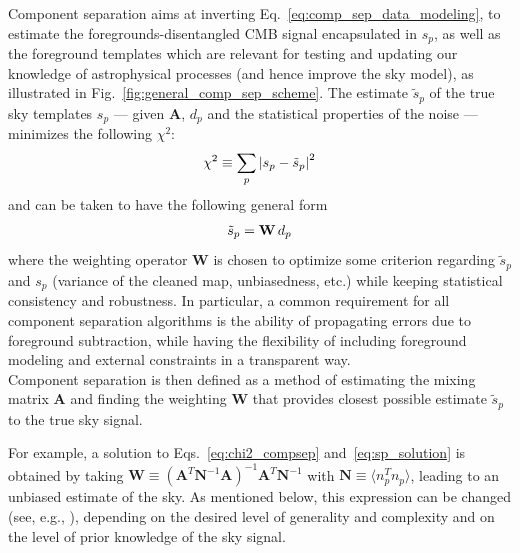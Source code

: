 Component separation aims at inverting Eq.~\ref{eq:comp_sep_data_modeling}, to estimate the foregrounds-disentangled CMB signal encapsulated in $s_p$, as well as the foreground templates which are relevant for testing and updating our knowledge of astrophysical processes (and hence improve the sky model), as illustrated in Fig.~\ref{fig:general_comp_sep_scheme}.
The estimate $\tilde{s}_p$ of the true sky templates $s_p$ --- given $\mathbf{A}$, $d_p$ and the statistical properties of the noise --- minimizes the following $\chi^2$:
\begin{eqnarray}
	\centering
		\chi^2 \equiv \sum_p \left| s_p - \tilde{s}_p\right|^2
	\label{eq:chi2_compsep}
\end{eqnarray}
and can be taken to have the following general form
\begin{eqnarray}
	\centering
		\tilde{s}_p = \mathbf{W}\,d_p
	\label{eq:sp_solution}
\end{eqnarray}
where the weighting operator $\mathbf{W}$ is chosen to optimize some criterion regarding $\tilde{s}_p$ and $s_p$ (variance of the cleaned map, unbiasedness, etc.) while keeping statistical consistency and robustness. In particular, a common requirement for all component separation algorithms is the ability of propagating errors due to foreground subtraction, while having the flexibility of including foreground modeling and external constraints in a transparent way. \\
Component separation is then defined as a method of estimating the mixing matrix $\mathbf{A}$ and finding the weighting $\mathbf{W}$ that provides closest possible estimate $\tilde{s}_p$ to the true sky signal.

For example, a solution to Eqs.~\ref{eq:chi2_compsep} and~\ref{eq:sp_solution} is obtained by taking $\mathbf{W} \equiv \left( \mathbf{A}^T\mathbf{N}^{-1}\mathbf{A} \right)^{-1}\mathbf{A}^T\mathbf{N}^{-1}$ with $\mathbf{N} \equiv \langle n_p^T n_p\rangle$, leading to an unbiased estimate of the sky. As mentioned below, this expression can be changed (see, e.g., \cite{delabrouille09}), depending on the desired level of generality and complexity and on the level of prior knowledge of the sky signal.


